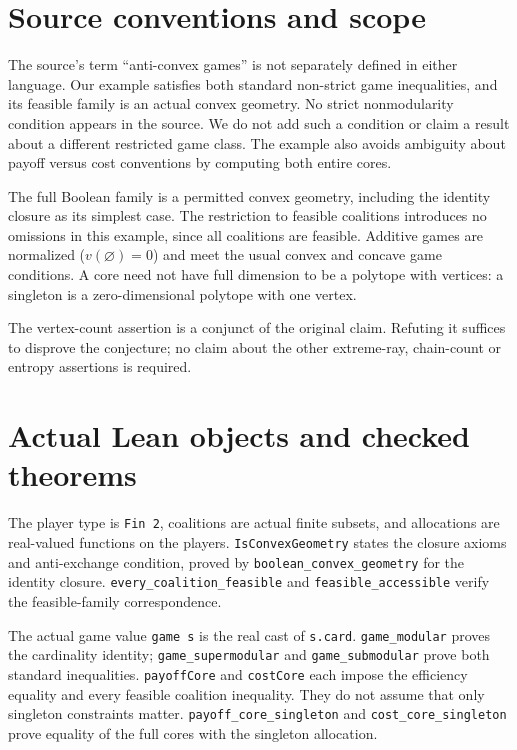 \documentclass[11pt]{article}
\begin{document}
\section*{Source conventions and scope}
The source's term ``anti-convex games'' is not separately defined in either
language. Our example satisfies both standard non-strict game inequalities,
and its feasible family is an actual convex geometry. No strict
nonmodularity condition appears in the source. We do not add such a
condition or claim a result about a different restricted game class.
The example also avoids ambiguity about payoff versus cost conventions by
computing both entire cores.

The full Boolean family is a permitted convex geometry, including the
identity closure as its simplest case. The restriction to feasible
coalitions introduces no omissions in this example, since all coalitions
are feasible. Additive games are normalized ($v(\varnothing)=0$) and meet
the usual convex and concave game conditions. A core need not have full
dimension to be a polytope with vertices: a singleton is a zero-dimensional
polytope with one vertex.

The vertex-count assertion is a conjunct of the original claim. Refuting
it suffices to disprove the conjecture; no claim about the other extreme-ray,
chain-count or entropy assertions is required.

\section*{Actual Lean objects and checked theorems}
The player type is \texttt{Fin 2}, coalitions are actual finite subsets,
and allocations are real-valued functions on the players.
\texttt{IsConvexGeometry} states the closure axioms and anti-exchange
condition, proved by \texttt{boolean\_convex\_geometry} for the identity
closure. \texttt{every\_coalition\_feasible} and
\texttt{feasible\_accessible} verify the feasible-family correspondence.

The actual game value \texttt{game s} is the real cast of
\texttt{s.card}. \texttt{game\_modular} proves the cardinality identity;
\texttt{game\_supermodular} and \texttt{game\_submodular} prove both
standard inequalities. \texttt{payoffCore} and \texttt{costCore} each
impose the efficiency equality and every feasible coalition inequality.
They do not assume that only singleton constraints matter.
\texttt{payoff\_core\_singleton} and \texttt{cost\_core\_singleton}
prove equality of the full cores with the singleton allocation.
\end{document}
